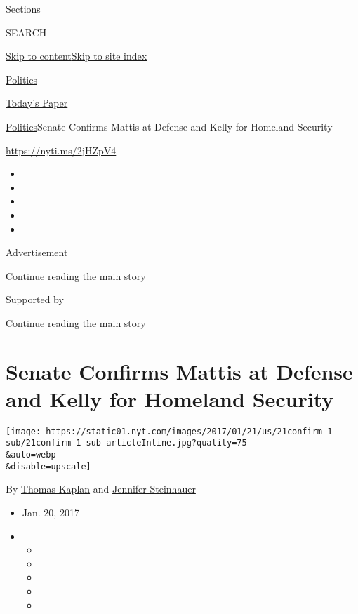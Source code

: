 Sections

SEARCH

\protect\hyperlink{site-content}{Skip to
content}\protect\hyperlink{site-index}{Skip to site index}

\href{https://www.nytimes.com/section/politics}{Politics}

\href{https://myaccount.nytimes.com/auth/login?response_type=cookie\&client_id=vi}{}

\href{https://www.nytimes.com/section/todayspaper}{Today's Paper}

\href{/section/politics}{Politics}\textbar{}Senate Confirms Mattis at
Defense and Kelly for Homeland Security

\url{https://nyti.ms/2jHZpV4}

\begin{itemize}
\item
\item
\item
\item
\item
\end{itemize}

Advertisement

\protect\hyperlink{after-top}{Continue reading the main story}

Supported by

\protect\hyperlink{after-sponsor}{Continue reading the main story}

\hypertarget{senate-confirms-mattis-at-defense-and-kelly-for-homeland-security}{%
\section{Senate Confirms Mattis at Defense and Kelly for Homeland
Security}\label{senate-confirms-mattis-at-defense-and-kelly-for-homeland-security}}

\texttt{[image: https://static01.nyt.com/images/2017/01/21/us/21confirm-1-sub/21confirm-1-sub-articleInline.jpg?quality=75\\\&auto=webp\\\&disable=upscale]}

By \href{http://www.nytimes.com/by/thomas-kaplan}{Thomas Kaplan} and
\href{http://www.nytimes.com/by/jennifer-steinhauer}{Jennifer
Steinhauer}

\begin{itemize}
\item
  Jan. 20, 2017
\item
  \begin{itemize}
  \item
  \item
  \item
  \item
  \item
  \end{itemize}
\end{itemize}

